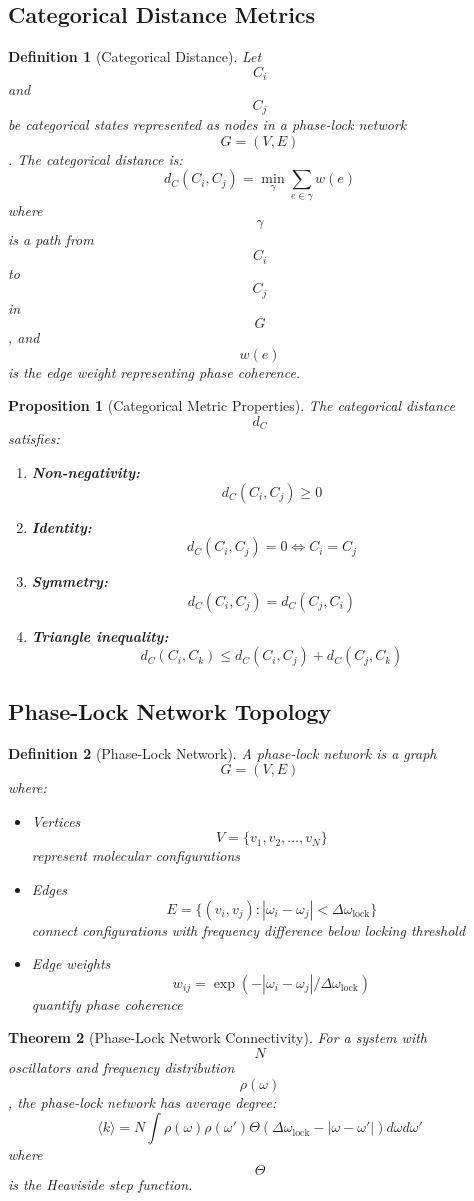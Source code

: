 \documentclass[12pt,a4paper]{article}
\newtheorem{theorem}{Theorem}
\newtheorem{proposition}[theorem]{Proposition}
\newtheorem{definition}{Definition}
\begin{document}
\subsection{Categorical Distance Metrics}

\begin{definition}[Categorical Distance]
Let $$C_i$$ and $$C_j$$ be categorical states represented as nodes in a phase-lock network $$G = (V, E)$$. The categorical distance is:
$$
d_C(C_i, C_j) = \min_{\gamma} \sum_{e \in \gamma} w(e)
$$
where $$\gamma$$ is a path from $$C_i$$ to $$C_j$$ in $$G$$, and $$w(e)$$ is the edge weight representing phase coherence.
\end{definition}

\begin{proposition}[Categorical Metric Properties]
The categorical distance $$d_C$$ satisfies:
\begin{enumerate}
\item \textbf{Non-negativity:} $$d_C(C_i, C_j) \geq 0$$
\item \textbf{Identity:} $$d_C(C_i, C_j) = 0 \iff C_i = C_j$$
\item \textbf{Symmetry:} $$d_C(C_i, C_j) = d_C(C_j, C_i)$$
\item \textbf{Triangle inequality:} $$d_C(C_i, C_k) \leq d_C(C_i, C_j) + d_C(C_j, C_k)$$
\end{enumerate}
\end{proposition}

\subsection{Phase-Lock Network Topology}

\begin{definition}[Phase-Lock Network]
A phase-lock network is a graph $$G = (V, E)$$ where:
\begin{itemize}
\item Vertices $$V = \{v_1, v_2, \ldots, v_N\}$$ represent molecular configurations
\item Edges $$E = \{(v_i, v_j) : |\omega_i - \omega_j| < \Delta\omega_{\text{lock}}\}$$ connect configurations with frequency difference below locking threshold
\item Edge weights $$w_{ij} = \exp(-|\omega_i - \omega_j|/\Delta\omega_{\text{lock}})$$ quantify phase coherence
\end{itemize}
\end{definition}

\begin{theorem}[Phase-Lock Network Connectivity]
For a system with $$N$$ oscillators and frequency distribution $$\rho(\omega)$$, the phase-lock network has average degree:
$$
\langle k \rangle = N \int \rho(\omega) \rho(\omega') \Theta(\Delta\omega_{\text{lock}} - |\omega - \omega'|) d\omega d\omega'
$$
where $$\Theta$$ is the Heaviside step function.
\end{theorem}
\end{document}
